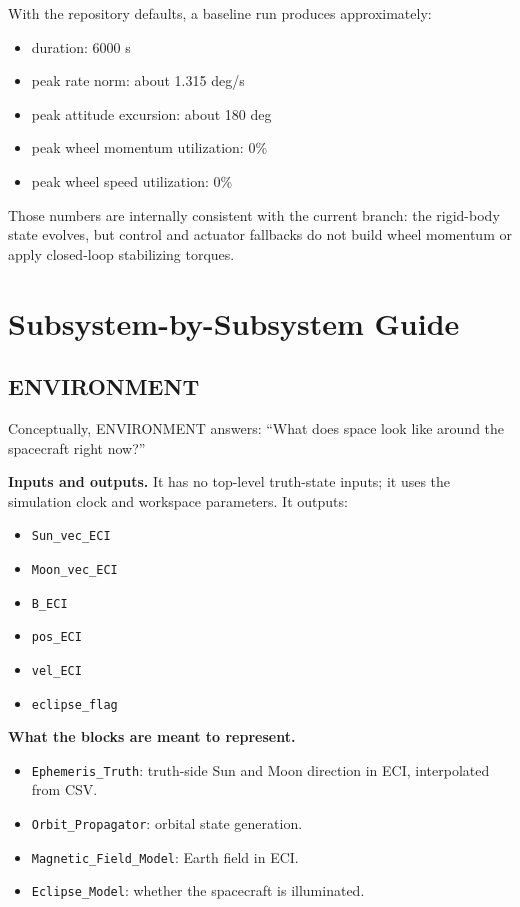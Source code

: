 \documentclass[11pt]{article}
\begin{document}
With the repository defaults, a baseline run produces approximately:

\begin{itemize}
\item duration: 6000 s
\item peak rate norm: about 1.315 deg/s
\item peak attitude excursion: about 180 deg
\item peak wheel momentum utilization: 0\%
\item peak wheel speed utilization: 0\%
\end{itemize}

Those numbers are internally consistent with the current branch: the rigid-body state evolves, but control and actuator fallbacks do not build wheel momentum or apply closed-loop stabilizing torques.

\section{Subsystem-by-Subsystem Guide}

\subsection{ENVIRONMENT}

Conceptually, ENVIRONMENT answers: ``What does space look like around the spacecraft right now?''

\textbf{Inputs and outputs.} It has no top-level truth-state inputs; it uses the simulation clock and workspace parameters. It outputs:

\begin{itemize}
\item \texttt{Sun\_vec\_ECI}
\item \texttt{Moon\_vec\_ECI}
\item \texttt{B\_ECI}
\item \texttt{pos\_ECI}
\item \texttt{vel\_ECI}
\item \texttt{eclipse\_flag}
\end{itemize}

\textbf{What the blocks are meant to represent.}

\begin{itemize}
\item \texttt{Ephemeris\_Truth}: truth-side Sun and Moon direction in ECI, interpolated from CSV.
\item \texttt{Orbit\_Propagator}: orbital state generation.
\item \texttt{Magnetic\_Field\_Model}: Earth field in ECI.
\item \texttt{Eclipse\_Model}: whether the spacecraft is illuminated.
\end{itemize}
\end{document}

